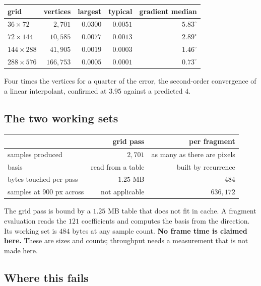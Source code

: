 \begin{center}
\begin{tabular}{@{}lrrrr@{}}
\toprule
grid & vertices & largest & typical & gradient median \\
\midrule
\(36 \times 72\) & \(2{,}701\) & \(0.0300\) & \(0.0051\) & \(5.83^\circ\) \\
\(72 \times 144\) & \(10{,}585\) & \(0.0077\) & \(0.0013\) & \(2.89^\circ\) \\
\(144 \times 288\) & \(41{,}905\) & \(0.0019\) & \(0.0003\) & \(1.46^\circ\) \\
\(288 \times 576\) & \(166{,}753\) & \(0.0005\) & \(0.0001\) & \(0.73^\circ\) \\
\bottomrule
\end{tabular}
\end{center}

Four times the vertices for a quarter of the error, the second-order convergence of a linear interpolant, confirmed at \(3.95\) against a predicted \(4\).

\subsection{The two working sets}

\begin{center}
\begin{tabular}{@{}lrr@{}}
\toprule
 & grid pass & per fragment \\
\midrule
samples produced & \(2{,}701\) & as many as there are pixels \\
basis & read from a table & built by recurrence \\
bytes touched per pass & \(1.25\) MB & \(484\) \\
samples at 900 px across & not applicable & \(636{,}172\) \\
\bottomrule
\end{tabular}
\end{center}

The grid pass is bound by a \(1.25\) MB table that does not fit in cache. A fragment evaluation reads the \(121\) coefficients and computes the basis from the direction. Its working set is \(484\) bytes at any sample count. \textbf{No frame time is claimed here.} These are sizes and counts; throughput needs a measurement that is not made here.

\subsection{Where this fails}

